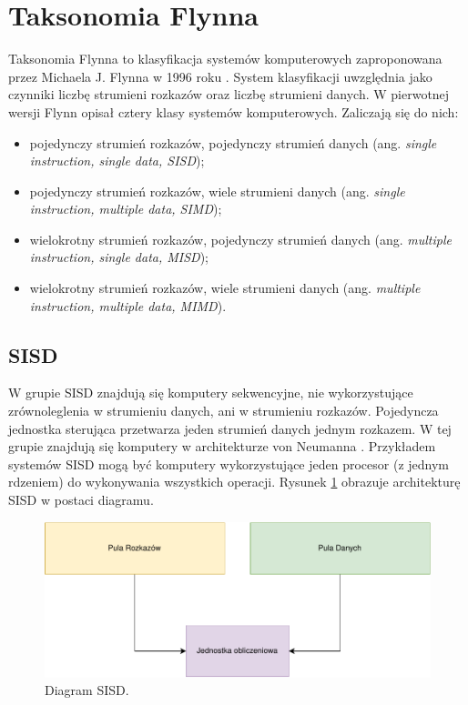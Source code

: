\documentclass[a4paper,12pt]{book} %
\begin{document}
\section{Taksonomia Flynna}
Taksonomia Flynna to klasyfikacja systemów komputerowych zaproponowana przez Michaela J. Flynna w 1996 roku \cite{Flynn1966}. System klasyfikacji uwzględnia jako czynniki liczbę strumieni rozkazów oraz liczbę strumieni danych.
W pierwotnej wersji Flynn opisał cztery klasy systemów komputerowych. Zaliczają się do nich:
\begin{itemize}[topsep=1pt, itemsep=0.5pt]
	\item pojedynczy strumień rozkazów, pojedynczy strumień danych (ang. \emph{single instruction, single data, SISD});
	\item pojedynczy strumień rozkazów, wiele strumieni danych (ang. \emph{single instruction, multiple data, SIMD});
	\item wielokrotny strumień rozkazów, pojedynczy strumień danych (ang. \emph{multiple instruction, single data, MISD});
	\item wielokrotny strumień rozkazów, wiele strumieni danych (ang. \emph{multiple instruction, multiple data, MIMD}).
\end{itemize}

\subsection{SISD}
W grupie SISD znajdują się komputery sekwencyjne, nie wykorzystujące zrównoleglenia w strumieniu danych, ani w strumieniu rozkazów. Pojedyncza jednostka sterująca przetwarza jeden strumień danych jednym rozkazem. W tej grupie znajdują się komputery w architekturze von Neumanna \cite{Neumann}. Przykładem systemów SISD mogą być komputery wykorzystujące jeden procesor (z jednym rdzeniem) do wykonywania wszystkich operacji. Rysunek \ref{fig:sisd} obrazuje architekturę SISD w postaci diagramu.
\begin{figure}
	\centering
	\includegraphics[scale=1]{assets/SISD.pdf}
	\caption{Diagram SISD.}
	\label{fig:sisd}
\end{figure}
\end{document}
